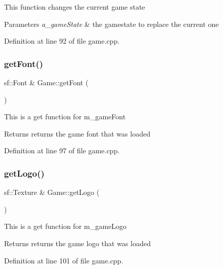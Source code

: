 This function changes the current game state


\begin{DoxyParams}{Parameters}
{\em a\+\_\+game\+State} & the gamestate to replace the current one \\
\hline
\end{DoxyParams}


Definition at line 92 of file game.\+cpp.

\mbox{\label{class_game_a813ff20fa498389e4bb120090803676b}} 
\subsubsection{\texorpdfstring{get\+Font()}{getFont()}}
{\footnotesize\ttfamily sf\+::\+Font \& Game\+::get\+Font (\begin{DoxyParamCaption}{ }\end{DoxyParamCaption})}

This is a get function for m\+\_\+game\+Font

\begin{DoxyReturn}{Returns}
returns the game font that was loaded 
\end{DoxyReturn}


Definition at line 97 of file game.\+cpp.

\mbox{\label{class_game_a4eb607b287a0aa0238339454399edc8b}} 
\subsubsection{\texorpdfstring{get\+Logo()}{getLogo()}}
{\footnotesize\ttfamily sf\+::\+Texture \& Game\+::get\+Logo (\begin{DoxyParamCaption}{ }\end{DoxyParamCaption})}

This is a get function for m\+\_\+game\+Logo

\begin{DoxyReturn}{Returns}
returns the game logo that was loaded 
\end{DoxyReturn}


Definition at line 101 of file game.\+cpp.

\mbox{\label{class_game_aa231abe1d7a36b55599ca459c815b2a5}} 
